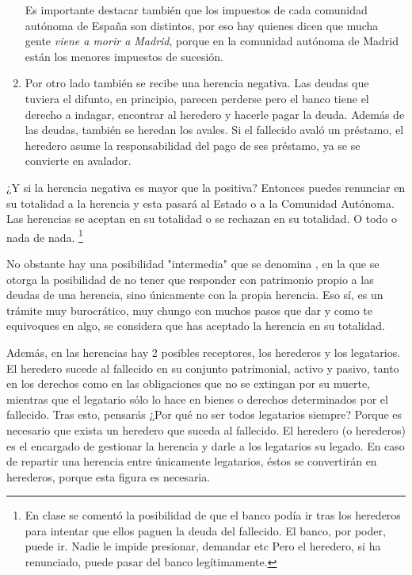 \documentclass[nochap,palatino,shortheader]{apuntes}
\newcommand{\study}[1]{#1} \newcommand{\substudy}[1]{#1}
\begin{document}
\begin{enumerate}
Es importante destacar también que \substudy{los impuestos de cada comunidad autónoma de España son distintos}, por eso hay quienes dicen que mucha gente \textit{viene a morir a Madrid}, porque en la comunidad autónoma de Madrid están los menores impuestos de sucesión.


\item Por otro lado también se recibe una \study{herencia negativa}. 
Las \study{deudas} que tuviera el difunto, en principio, parecen perderse pero el banco tiene el derecho a indagar, encontrar al heredero y hacerle pagar la deuda.
Además de las deudas, también se heredan los \study{avales}. 
Si el fallecido avaló un préstamo, el heredero asume la responsabilidad del pago de ses préstamo, ya se se convierte en avalador.

\end{enumerate}

¿Y si la herencia negativa es mayor que la positiva? Entonces puedes renunciar en su totalidad a la herencia y esta pasará al Estado o a la Comunidad Autónoma. \substudy{Las herencias se aceptan en su totalidad o se rechazan en su totalidad}. O todo o nada de nada. 
\footnote{En clase se comentó la posibilidad de que el banco podía ir tras los herederos para intentar que ellos paguen la deuda del fallecido. El banco, por poder, puede ir. Nadie le impide presionar, demandar etc Pero el heredero, si ha renunciado, puede pasar del banco legítimamente.}

No obstante hay una posibilidad "intermedia" que se denomina , en la que se otorga la posibilidad de no tener que responder con patrimonio propio a las deudas de una herencia, sino únicamente con la propia herencia. 
Eso sí, es un trámite muy burocrático, muy chungo con muchos pasos que dar y como te equivoques en algo, se considera que has aceptado la herencia en su totalidad.

Además, en las herencias hay 2 posibles receptores, los herederos y los legatarios. 
El \substudy{heredero sucede al fallecido} en su conjunto patrimonial, activo y pasivo, \substudy{tanto en los derechos como en las obligaciones} que no se extingan por su muerte, mientras que el \substudy{legatario sólo} lo hace en \substudy{bienes o derechos} determinados por el fallecido.
Tras esto, pensarás ¿Por qué no ser todos legatarios siempre?
Porque es \substudy{necesario que exista un heredero} que suceda al fallecido. El heredero (o herederos) es el encargado de gestionar la herencia y darle a los legatarios su legado. 
En caso de repartir una herencia entre únicamente legatarios, éstos se convertirán en herederos, porque esta figura es necesaria.
\end{document}
